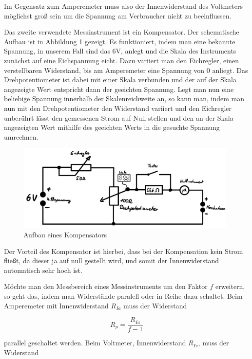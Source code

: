 \documentclass{article}
\begin{document}
Im Gegensatz zum Amperemeter muss also der Innenwiderstand des Voltmeters möglichst groß sein um die Spannung am Verbraucher nicht zu beeinflussen.

Das zweite verwendete Messinstrument ist ein Kompensator. Der schematische Aufbau ist in Abbildung \ref{fig:kompensator} gezeigt. Es funktioniert, indem man eine bekannte Spannung, in unserem Fall sind das 6V, anlegt und die Skala des Instruments zunächst auf eine Eichspannung eicht. Dazu variiert man den Eichregler, einen verstellbaren Widerstand, bis am Amperemeter eine Spannung von 0 anliegt. Das Drehpotentiometer ist dabei mit einer Skala verbunden und der auf der Skala angezeigte Wert entspricht dann der geeichten Spannung. Legt man nun eine beliebige Spannung innerhalb der Skalenreichweite an, so kann man, indem man nun mit den Drehpotentiometer den Widerstand variiert und den Eichregler unberührt lässt den gemessenen Strom auf Null stellen und den an der Skala angezeigten Wert mithilfe des geeichten Werts in die gesuchte Spannung umrechnen.

\begin{figure} [!h]
    \centering
    \includegraphics[width=11cm]{graphics/komp.jpg}
    \caption{Aufbau eines Kompensators}
    \label{fig:kompensator}
\end{figure}

Der Vorteil des Kompensator ist hierbei, dass bei der Kompensation kein Strom fließt, da dieser ja auf null gestellt wird, und somit der Innenwiderstand automatisch sehr hoch ist.

\newpage

Möchte man den Messbereich eines Messinstruments um den Faktor $f$ erweitern, so geht das, indem man Widerstände paralell oder in Reihe dazu schaltet. Beim Amperemeter mit Innenwiderstand $R_{Ia}$ muss der Widerstand

\begin{equation}
    R_p = \frac{R_{Ia}}{f-1}
\end{equation}

parallel geschaltet werden. Beim Voltmeter, Innenwiderstand $R_{Iv}$, muss der Widerstand
\end{document}
